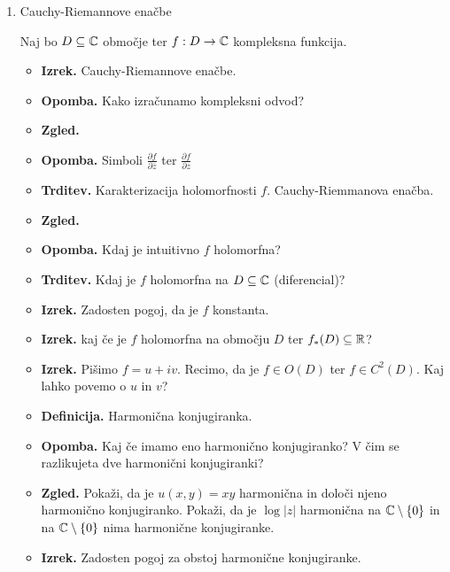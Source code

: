 \begin{enumerate}
    \item Cauchy-Riemannove enačbe
    
    Naj bo \(D \subseteq \mathbb{C}\) območje ter \(f: D \to \mathbb{C}\) kompleksna funkcija.
    \begin{itemize}
        \item \textbf{Izrek.} Cauchy-Riemannove enačbe. 
        \item \textbf{Opomba.} Kako izračunamo kompleksni odvod?
        \item \textbf{Zgled.} 
        \item \textbf{Opomba.} Simboli \(\frac{\partial f}{\partial \overline{z}}\) ter \(\frac{\partial f}{\partial z}\)
        \item \textbf{Trditev.} Karakterizacija holomorfnosti \(f\). Cauchy-Riemmanova enačba.
        \item \textbf{Zgled.} 
        \item \textbf{Opomba.} Kdaj je intuitivno \(f\) holomorfna?
        \item \textbf{Trditev.} Kdaj je \(f\) holomorfna na \(D \subseteq \mathbb{C}\) (diferencial)?
        \item \textbf{Izrek.} Zadosten pogoj, da je \(f\) konstanta.
        \item \textbf{Izrek.} kaj če je \(f\) holomorfna na območju \(D\) ter \(f_{*}(D) \subseteq \mathbb{R}\)?
        \item \textbf{Izrek.} Pišimo \(f = u + iv\). Recimo, da je \(f \in O(D)\) ter \(f \in C^2(D)\). Kaj lahko povemo o \(u\) in \(v\)?
        \item \textbf{Definicija.} Harmonična konjugiranka.
        \item \textbf{Opomba.} Kaj če imamo eno harmonično konjugiranko? V čim se razlikujeta dve harmonični konjugiranki?
        \item \textbf{Zgled.} Pokaži, da je \(u(x, y) = xy\) harmonična in določi njeno harmonično konjugiranko.  Pokaži, da je \(\log |z|\) harmonična na \(\mathbb{C} \setminus \{0\}\) in na \(\mathbb{C} \setminus \{0\}\) nima harmonične konjugiranke.
        \item \textbf{Izrek.} Zadosten pogoj za obstoj harmonične konjugiranke.
    \end{itemize}
\end{enumerate}